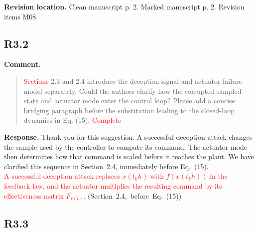 \documentclass[12pt,a4paper]{article}
\begin{document}
\textbf{Revision location.} Clean manuscript p. 2. Marked manuscript p. 2. Revision items M08.

\subsection*{R3.2}

\textbf{Comment.}
\begin{quote}
\raggedright
\textcolor{red}{Sections} 2.3 and 2.4 introduce the deception signal and actuator-failure model separately. Could the authors clarify how the corrupted sampled state and actuator mode enter the control loop? Please add a concise bridging paragraph before the substitution leading to the closed-loop dynamics in Eq. (15). \textcolor{red}{Complete}
\end{quote}

\textbf{Response.}
Thank you for this suggestion. A successful deception attack changes the sample used by the controller to compute its command. The actuator mode then determines how that command is scaled before it reaches the plant. We have clarified this sequence in Section~2.4, immediately before Eq.~(15).\\[4pt]
\textcolor{red}{A successful deception attack replaces $x(t_kh)$ with $f(x(t_kh))$ in the feedback law, and the actuator multiplies the resulting command by its effectiveness matrix $F_{r(t)}$.} \mbox{(Section~2.4, before Eq.~(15))}

%
%

\subsection*{R3.3}
\end{document}
